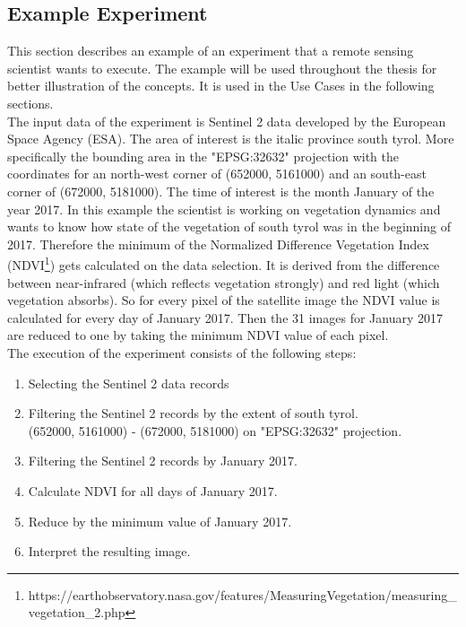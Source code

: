 \documentclass[draft,final]{vutinfth} %
\begin{document}
\subsection{Example Experiment}\label{example}

This section describes an example of an experiment that a remote sensing scientist wants to execute. The example will be used throughout the thesis for better illustration of the concepts. It is used in the Use Cases in the following sections. \\
The input data of the experiment is Sentinel 2 data developed by the European Space Agency (ESA). The area of interest is the italic province south tyrol. More specifically the bounding area in the "EPSG:32632" projection with the coordinates for an north-west corner of (652000, 5161000) and an south-east corner of (672000, 5181000). The time of interest is the month January of the year 2017. In this example the scientist is working on vegetation dynamics and wants to know how state of the vegetation of south tyrol was in the beginning of 2017. Therefore the minimum of the Normalized Difference Vegetation Index (NDVI\footnote{https://earthobservatory.nasa.gov/features/MeasuringVegetation/measuring\_vegetation\_2.php}) gets calculated on the data selection. It is derived from the difference between near-infrared (which reflects vegetation strongly) and red light (which vegetation absorbs). So for every pixel of the satellite image the NDVI value is calculated for every day of January 2017. Then the 31 images for January 2017 are reduced to one by taking the minimum NDVI value of each pixel. \\

The execution of the experiment consists of the following steps:

\begin{enumerate}
	\item Selecting the Sentinel 2 data records
	\item Filtering the Sentinel 2 records by the extent of south tyrol. \\(652000, 5161000) - (672000, 5181000) on "EPSG:32632" projection.
	\item Filtering the Sentinel 2 records by January 2017.
	\item Calculate NDVI for all days of January 2017.
	\item Reduce by the minimum value of January 2017.
	\item Interpret the resulting image.
\end{enumerate}
\end{document}
